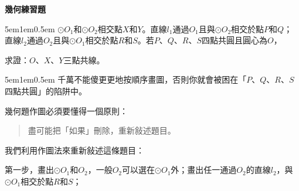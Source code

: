 \documentclass[12pt]{article}
\begin{document}
\thispagestyle{fancy}  %
\begin{center}
    \textbf{\Large{幾何練習題}}
\end{center}

\begin{mybox}[習題 1]{5em}{1em}{0.5em}
    $\odot{O_1}$和$\odot{O_2}$相交點$X$和$Y$。直線$l_1$通過$O_1$且與$\odot{O_2}$相交於點$P$和$Q$；
    直線$l_2$通過$O_2$且與$\odot{O_1}$相交於點$R$和$S$。若$P$、$Q$、$R$、$S$四點共圓且圓心為$O$，
    
    求證：$O$、$X$、$Y$三點共線。
\end{mybox}
\begin{mybox}[畫法 1-1]{5em}{1em}{0.5em}
    千萬不能傻更更地按順序畫圖，否則你就會被困在「$P$、$Q$、$R$、$S$四點共圓」的陷阱中。

    幾何題作圖必須要懂得一個原則：
    \begin{quotation}
        \centering
        盡可能把「如果」刪除，重新敍述題目。
    \end{quotation}

    我們利用作圖法來重新敍述這條題目：

    第一步，畫出$\odot{O_1}$和$O_2$，一般$O_2$可以選在$\odot{O_1}$外；畫出任一通過$O_2$的直線$l_2$，與$\odot{O_1}$相交於點$R$和$S$；
    \begin{figure}[H]
        \centering
    \end{figure}


\end{mybox}
\end{document}
